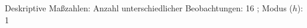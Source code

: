 				\label{tableValues:adem03b_g2}
				\vspace*{-\baselineskip}
                    \begin{noten}
                	    \note{} Deskriptive Maßzahlen:
                	    Anzahl unterschiedlicher Beobachtungen: 16%
                	    ; 
                	      Modus ($h$): 1
                     \end{noten}

